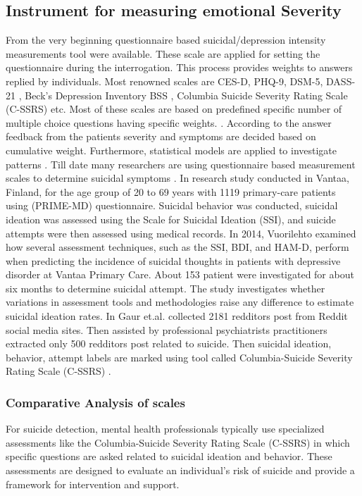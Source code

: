 \documentclass[sn-mathphys,Numbered]{sn-jnl}%
\theoremstyle{thmstyleone}%
\theoremstyle{thmstyletwo}%
\theoremstyle{thmstylethree}%
\begin{document}
\subsection{Instrument for measuring emotional Severity} 
From the very beginning questionnaire based suicidal/depression intensity measurements tool were available. These scale are applied for setting the questionnaire during the interrogation. This process provides weights to answers replied by individuals. Most renowned scales are CES-D, PHQ-9, DSM-5, DASS-21 \cite{radloff1977ces, havigerova2019text}, Beck's Depression Inventory BSS \cite{beck2000weisman}, Columbia Suicide Severity Rating Scale (C-SSRS) \cite{posner2011columbia, joiner1997modified} etc. Most of these scales are based on predefined specific number of multiple choice questions having specific weights. \cite{havigerova2019text, beck1961inventory, kroenke2001phq, tolentino2018dsm, kliem2017german, eke2010hamilton}. According to the answer feedback from the patients severity and symptoms are decided based on cumulative weight. Furthermore, statistical models are applied to investigate patterns \cite{shen2020detecting, shen2017depression}.  Till date many researchers are using questionnaire based measurement scales to determine suicidal symptoms \cite{li2022association}. In \cite{vuorilehto2006suicidal} research study conducted in Vantaa, Finland, for the age group of 20 to 69 years with 1119 primary-care patients using (PRIME-MD) questionnaire. Suicidal behavior was conducted, suicidal ideation was assessed using the Scale for Suicidal Ideation (SSI), and suicide attempts were then assessed using medical records. In 2014, Vuorilehto \cite{vuorilehto2014method} examined how several assessment techniques, such as the SSI, BDI, and HAM-D, perform when predicting the incidence of suicidal thoughts in patients with depressive disorder at Vantaa Primary Care. About 153 patient were investigated for about six months to determine suicidal attempt. The study investigates whether variations in assessment tools and methodologies raise any difference to estimate suicidal ideation rates. In \cite{gaur2019knowledge} Gaur et.al. collected 2181 redditors post from Reddit social media sites. Then assisted by professional psychiatrists practitioners extracted only 500 redditors post related to suicide. Then suicidal ideation, behavior, attempt labels are marked using tool called Columbia-Suicide Severity Rating Scale (C-SSRS) \cite{posner2011columbia}. 


\subsubsection{Comparative Analysis of scales}
For suicide detection, mental health professionals typically use specialized assessments like the Columbia-Suicide Severity Rating Scale (C-SSRS) in which specific questions are asked related to suicidal ideation and behavior. These assessments are designed to evaluate an individual's risk of suicide and provide a framework for intervention and support.
\end{document}
